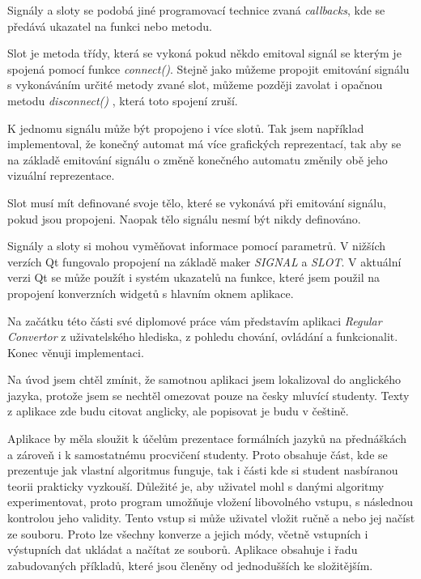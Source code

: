 
Signály a sloty se podobá jiné programovací technice zvaná \textit{callbacks}, kde se předává ukazatel na funkci nebo metodu. 

Slot je metoda třídy, která se vykoná pokud někdo emitoval signál se kterým je spojená pomocí funkce \textit{connect()}. Stejně jako můžeme propojit emitování signálu s vykonáváním určité metody zvané slot, můžeme později zavolat i opačnou metodu \textit{disconnect()} , která toto spojení zruší. 

K jednomu signálu může být propojeno i více slotů. Tak jsem například implementoval, že konečný automat má více grafických reprezentací, tak aby se na základě emitování signálu o změně konečného automatu změnily obě jeho vizuální reprezentace.

Slot musí mít definované svoje tělo, které se vykonává při emitování signálu, pokud jsou propojeni. Naopak tělo signálu nesmí být nikdy definováno.

Signály a sloty si mohou vyměňovat informace pomocí parametrů. V nižších verzích Qt fungovalo propojení na základě maker \textit{SIGNAL} a \textit{SLOT}. V aktuální verzi Qt se může použít i systém ukazatelů na funkce, které jsem použil na propojení konverzních widgetů s hlavním oknem aplikace.



Na začátku této části své diplomové práce vám představím aplikaci \textit{Regular Convertor} z uživatelského hlediska, z pohledu chování, ovládání a funkcionalit. Konec věnuji implementaci. 

Na úvod jsem chtěl zmínit, že samotnou aplikaci jsem lokalizoval do anglického jazyka, protože jsem se nechtěl omezovat pouze na česky mluvící studenty.
Texty z aplikace zde budu citovat anglicky, ale popisovat je budu v češtině. 

Aplikace by měla sloužit k účelům prezentace formálních jazyků na přednáškách a zároveň i k samostatnému procvičení studenty. Proto obsahuje část, kde se prezentuje jak vlastní algoritmus funguje, tak i části kde si student nasbíranou teorii prakticky vyzkouší. Důležité je, aby uživatel mohl s danými algoritmy experimentovat, proto program umožňuje vložení libovolného vstupu, s následnou kontrolou jeho validity. Tento vstup si může uživatel vložit ručně a nebo jej načíst ze souboru. Proto lze všechny konverze a jejich módy, včetně vstupních i výstupních dat ukládat a načítat ze souborů. Aplikace obsahuje i řadu zabudovaných příkladů, které jsou členěny od jednodušších ke složitějším.

